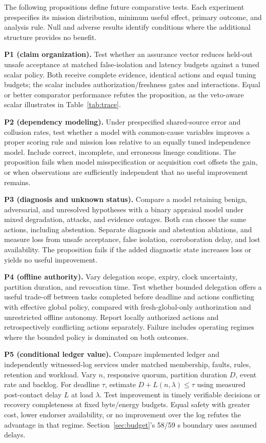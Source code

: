 The following propositions define future comparative tests. Each experiment prespecifies its mission distribution, minimum useful effect, primary outcome, and analysis rule. Null and adverse results identify conditions where the additional structure provides no benefit.

\textbf{P1 (claim organization).} Test whether an assurance vector reduces held-out unsafe acceptance at matched false-isolation and latency budgets against a tuned scalar policy. Both receive complete evidence, identical actions and equal tuning budgets; the scalar includes authorization/freshness gates and interactions. Equal or better comparator performance refutes the proposition, as the veto-aware scalar illustrates in Table~\ref{tab:trace}.

\textbf{P2 (dependency modeling).} Under prespecified shared-source error and collusion rates, test whether a model with common-cause variables improves a proper scoring rule and mission loss relative to an equally tuned independence model. Include correct, incomplete, and erroneous lineage conditions. The proposition fails when model misspecification or acquisition cost offsets the gain, or when observations are sufficiently independent that no useful improvement remains.

\textbf{P3 (diagnosis and unknown status).} Compare a model retaining benign, adversarial, and unresolved hypotheses with a binary appraisal model under mixed degradation, attacks, and evidence outages. Both can choose the same actions, including abstention. Separate diagnosis and abstention ablations, and measure loss from unsafe acceptance, false isolation, corroboration delay, and lost availability. The proposition fails if the added diagnostic state increases loss or yields no useful improvement.

\textbf{P4 (offline authority).} Vary delegation scope, expiry, clock uncertainty, partition duration, and revocation time. Test whether bounded delegation offers a useful trade-off between tasks completed before deadline and actions conflicting with effective global policy, compared with fresh-global-only authorization and unrestricted offline autonomy. Report locally authorized actions and retrospectively conflicting actions separately. Failure includes operating regimes where the bounded policy is dominated on both outcomes.

\textbf{P5 (conditional ledger value).} Compare implemented ledger and independently witnessed-log services under matched membership, faults, rules, retention and workload. Vary $n$, responsive quorum, partition duration $D$, event rate and backlog. For deadline $\tau$, estimate $D+L(n,\lambda)\leq\tau$ using measured post-contact delay $L$ at load $\lambda$. Test improvement in timely verifiable decisions or recovery completeness at fixed byte/energy budgets. Equal safety with greater cost, lower endorser availability, or no improvement over the log refutes the advantage in that regime. Section~\ref{sec:budget}'s 58/59 s boundary uses assumed delays.

